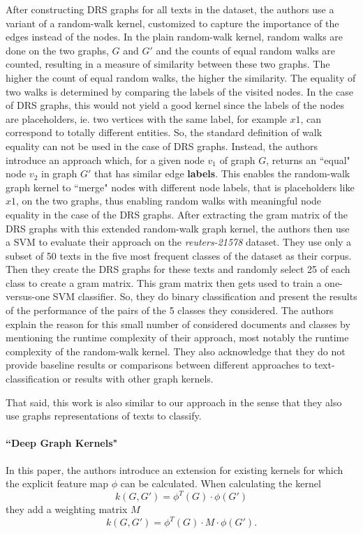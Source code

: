 After constructing DRS graphs for all texts in the dataset, the authors use a variant of a random-walk kernel, customized to capture the importance of the edges instead of the nodes.
In the plain random-walk kernel, random walks are done on the two graphs, $G$ and $G'$ and the counts of equal random walks are counted, resulting in a measure of similarity between these two graphs. The higher the count of equal random walks, the higher the similarity.
The equality of two walks is determined by comparing the labels of the visited nodes.
In the case of DRS graphs, this would not yield a good kernel since the labels of the nodes are placeholders, ie. two vertices with the same label, for example $x1$, can correspond to totally different entities.
So, the standard definition of walk equality can not be used in the case of DRS graphs.
Instead, the authors introduce an approach which, for a given node $v_1$ of graph $G$, returns an ``equal" node $v_2$ in graph $G'$ that has similar edge \textbf{labels}.
This enables the random-walk graph kernel to ``merge" nodes with different node labels, that is placeholders like $x1$, on the two graphs, thus enabling random walks with meaningful node equality in the case of the DRS graphs.
After extracting the gram matrix of the DRS graphs with this extended random-walk graph kernel, the authors then use a SVM to evaluate their approach on the \textit{reuters-21578} dataset.
They use only a subset of 50 texts in the five most frequent classes of the dataset as their corpus. Then they create the DRS graphs for these texts and randomly select 25 of each class to create a gram matrix.
This gram matrix then gets used to train a one-versus-one SVM classifier. So, they do binary classification and present the results of the performance of the pairs of the 5 classes they considered.
The authors explain the reason for this small number of considered documents and classes by mentioning the runtime complexity of their approach, most notably the runtime complexity of the random-walk kernel.
They also acknowledge that they do not provide baseline results or comparisons between different approaches to text-classification or results with other graph kernels.

That said, this work is also similar to our approach in the sense that they also use graphs representations of texts to classify.

\paragraph{``Deep Graph Kernels" \cite{Yanardag2015}}
In this paper, the authors introduce an extension for existing kernels for which the explicit feature map $\phi$ can be calculated.
When calculating the kernel
\begin{equation*}
k(G, G') = \phi^T(G) \cdot \phi(G')
\end{equation*}
they add a weighting matrix $M$
\begin{equation*}
k(G, G') = \phi^T(G) \cdot M \cdot \phi(G').
\end{equation*}

